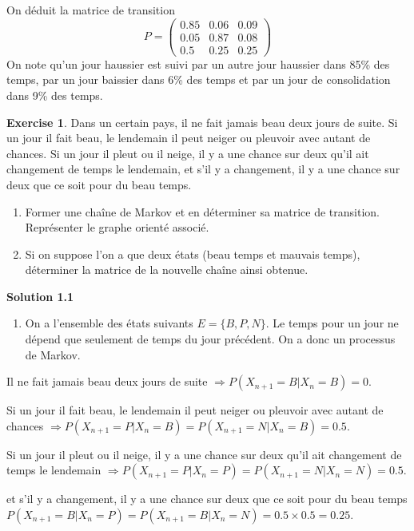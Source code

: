 \documentclass[
]{book}
\providecommand{\tightlist}{%
  \setlength{\itemsep}{0pt}\setlength{\parskip}{0pt}}
\theoremstyle{definition}
\theoremstyle{definition}
\theoremstyle{definition}
\newtheorem{exercise}{Exercise}[chapter]
\theoremstyle{remark}
\begin{document}
On déduit la matrice de transition
\[
P=\left( 
\begin{array}{ccc}
0.85 & 0.06 & 0.09 \\
0.05 & 0.87 & 0.08 \\
0.5 & 0.25 & 0.25
\end{array}
\right)
\]
On note qu'un jour haussier est suivi par un autre jour haussier dans 85\% des temps, par un jour baissier dans 6\% des temps et par un jour de consolidation dans 9\% des temps.
\begin{exercise}
\protect\hypertarget{exr:unnamed-chunk-14}{}{\label{exr:unnamed-chunk-14} }Dans un certain pays, il ne fait jamais beau deux jours de suite. Si un jour il fait beau, le lendemain il peut neiger ou pleuvoir avec autant de chances. Si un jour il pleut ou il neige, il y a une chance sur deux qu'il ait changement de temps le lendemain, et s'il y a changement, il y a une chance sur deux que ce soit pour du beau temps.

\begin{enumerate}
\def\labelenumi{\arabic{enumi}.}
\tightlist
\item
  Former une chaîne de Markov et en déterminer sa matrice de transition. Représenter le graphe orienté associé.
\item
  Si on suppose l'on a que deux états (beau temps et mauvais temps), déterminer la matrice de la nouvelle chaîne ainsi obtenue.
\end{enumerate}
\end{exercise}

\textbf{Solution 1.1}

\begin{enumerate}
\def\labelenumi{\arabic{enumi}.}
\tightlist
\item
  On a l'ensemble des états suivants \(E=\{B,P,N \}\). Le temps pour un jour ne dépend que seulement de temps du jour précédent. On a donc un processus de Markov.
\end{enumerate}

Il ne fait jamais beau deux jours de suite \(\Longrightarrow P(X_{n+1}=B|X_n=B)=0\).

Si un jour il fait beau, le lendemain il peut neiger ou pleuvoir avec autant de chances \(\Longrightarrow P(X_{n+1}=P|X_n=B)=P(X_{n+1}=N|X_n=B)=0.5\).

Si un jour il pleut ou il neige, il y a une chance sur deux qu'il ait changement de temps le lendemain \(\Longrightarrow P(X_{n+1}=P|X_n=P)=P(X_{n+1}=N|X_n=N)=0.5\).

et s'il y a changement, il y a une chance sur deux que ce soit pour du beau temps \(P(X_{n+1}=B|X_n=P)=P(X_{n+1}=B|X_n=N)=0.5\times 0.5=0.25\).
\end{document}
